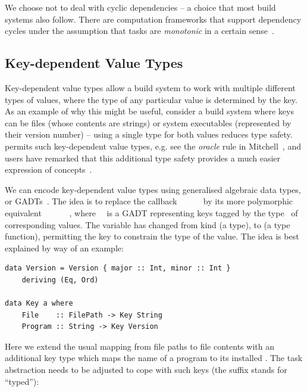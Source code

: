 We choose not to deal with cyclic dependencies -- a choice that most build
systems also follow. There are computation frameworks that support dependency
cycles under the assumption that tasks are \emph{monotonic} in a certain
sense~\cite{pottier2009lazy,radul2009propagation}.

\vspace{-1mm}
\subsection{Key-dependent Value Types}\label{sec-polymorphism}

Key-dependent value types allow a build system to work with multiple different
types of values, where the type of any particular value is determined by the
key. As an example of why this might be useful, consider a build system where
keys can be files (whose contents are strings) or system executables
(represented by their version number) -- using a single type for both values
reduces type safety. \Shake permits such key-dependent value types, e.g. see
the \emph{oracle} rule in Mitchell~, and users
have remarked that this additional type safety provides a much easier expression
of concepts~\cite{hadrian}.

We can encode key-dependent value types using generalised algebraic data types,
or GADTs~\cite{spj2006gadts}. The idea is to replace
the callback ~\hs{::}~~\hs{->}~~ by its
more polymorphic equivalent ~\hs{::}~~~\hs{->}~~,
where~~ is a GADT representing keys tagged by the type~ of
corresponding values. The variable  has changed from kind \hs{*} (a type),
to \hs{* -> *} (a type function), permitting the key to constrain the type of the value.
The idea is best explained by way of an example:

\vspace{1mm}
\begin{verbatim}
data Version = Version { major :: Int, minor :: Int }
    deriving (Eq, Ord)

data Key a where
    File    :: FilePath -> Key String
    Program :: String -> Key Version
\end{verbatim}
\vspace{1mm}

\noindent
Here we extend the usual mapping from file paths to file contents with an
additional key type  which maps the name of a program to its installed . The task
abstraction needs to be adjusted to cope with such keys (the suffix 
stands for ``typed''):

